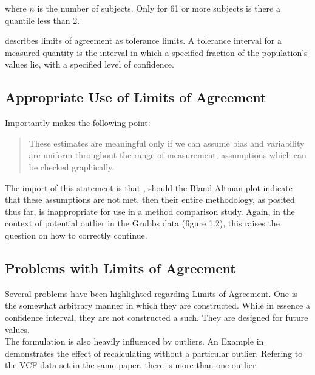 \documentclass[12pt, a4paper]{report}
\begin{document}
	\noindent where $n$ is the number of subjects. Only for 61 or more
	subjects is there a quantile less than 2.
	
	\citet{luiz} describes limits of agreement as tolerance limits. A
	tolerance interval for a measured quantity is the interval in
	which a specified fraction of the population's values lie, with a
	specified level of confidence.
	
	
	\subsection{Appropriate Use of Limits of Agreement}
	Importantly \citet{BA99} makes the following point:
	\begin{quote}These estimates are meaningful only if we can assume
		bias and variability are uniform throughout the range of
		measurement, assumptions which can be checked graphically.
	\end{quote}
	
	The import of this statement is that , should the Bland Altman
	plot indicate that these assumptions are not met, then their
	entire methodology, as posited thus far, is inappropriate for use
	in a method comparison study. Again, in the context of potential
	outlier in the Grubbs data (figure 1.2), this raises the question
	on how to correctly continue.
	\subsection{Problems with Limits of Agreement}
	
	Several problems have been highlighted regarding Limits of
	Agreement. One is the somewhat arbitrary manner in which they are
	constructed. While in essence a confidence interval, they are not
	constructed a such. They are designed for future values.
	\\
	The formulation is also heavily influenced by outliers. An Example
	in \citet*{BA83} demonstrates the effect of recalculating without
	a particular outlier. Refering to the VCF data set in the same
	paper, there is more than one outlier.
	
	
\end{document}
